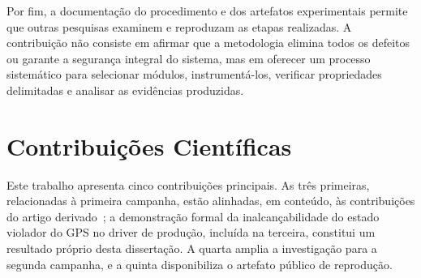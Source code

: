 Por fim, a documentação do procedimento e dos artefatos experimentais permite que outras pesquisas examinem e reproduzam as etapas realizadas. A contribuição não consiste em afirmar que a metodologia elimina todos os defeitos ou garante a segurança integral do sistema, mas em oferecer um processo sistemático para selecionar módulos, instrumentá-los, verificar propriedades delimitadas e analisar as evidências produzidas.

\section{Contribuições Científicas}
\label{sec:contribuicoes}

Este trabalho apresenta cinco contribuições principais. As três primeiras, relacionadas à primeira campanha, estão alinhadas, em conteúdo, às contribuições do artigo derivado~\cite{Rodrigues2026}; a demonstração formal da inalcançabilidade do estado violador do GPS no driver de produção, incluída na terceira, constitui um resultado próprio desta dissertação. A quarta amplia a investigação para a segunda campanha, e a quinta disponibiliza o artefato público de reprodução.

